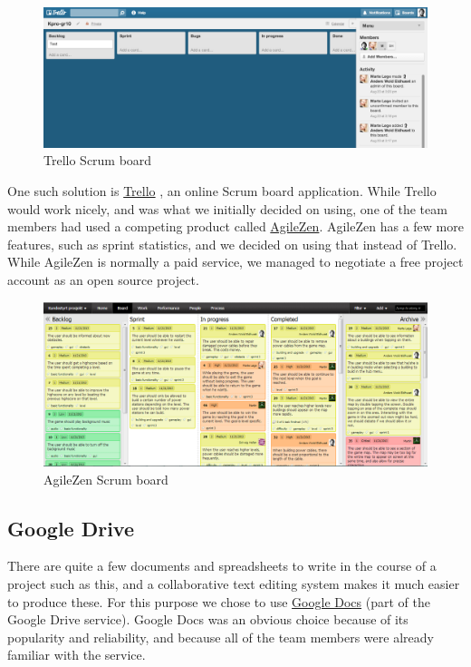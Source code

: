     \begin{figure}[htb]
      \centering
      \includegraphics[width=1\textwidth]{pictures/trello.png}
      \caption{Trello Scrum board}
    \end{figure}

    One such solution is \href{https://trello.com}{Trello} \cite{trello, trelloPage}, an online Scrum
    board application. While Trello would work nicely, and was what we initially
    decided on using, one of the team members had used a competing product called
    \href{http://www.agilezen.com/}{AgileZen}. AgileZen has a few more features,
    such as sprint statistics, and we decided on using that instead of Trello.
    While AgileZen is normally a paid service, we managed to negotiate a free
    project account as an open source project.

    \begin{figure}[htb]
      \centering
      \includegraphics[width=1\textwidth]{pictures/agilezen2.png}
      \caption{AgileZen Scrum board}
    \end{figure}

\subsection{Google Drive}
    There are quite a few documents and spreadsheets to write in the course
    of a project such as this, and a collaborative text editing system
    makes it much easier to produce these. For this purpose we chose to use
    \href{https://drive.google.com}{Google Docs} (part of the Google Drive
    service). Google Docs was an obvious choice because of its popularity and
    reliability, and because all of the team members were already familiar with the
    service. \cite{drive}

